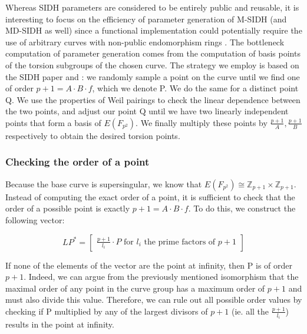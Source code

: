 \documentclass[a4paper,11pt,oneside]{report}
\begin{document}
    Whereas SIDH parameters are considered to be entirely public and reusable, it is interesting to focus on the efficiency of parameter generation of M-SIDH (and MD-SIDH as well) since a functional implementation could potentially require the use of arbitrary curves with non-public endomorphism rings \cite{msidh}. The bottleneck computation of parameter generation comes from the computation of basis points of the torsion subgroups of the chosen curve. The strategy we employ is based on the SIDH paper \cite{original-sidh} and \cite[Corollary 24.31]{pairing}: we randomly sample a point on the curve until we find one of order $p+1 = A\cdot B \cdot f$, which we denote P. We do the same for a distinct point Q. We use the properties of Weil pairings to check the linear dependence between the two points, and adjust our point Q until we have two linearly independent points that form a basis of $E(F_{ p^{2}})$. We finally multiply these points by $\frac{p+1}{A}, \frac{p+1}{B}$ respectively to obtain the desired torsion points.

        \subsubsection{Checking the order of a point}
    
        Because the base curve is supersingular, we know that $E(F_{ p^{2}}) \cong \mathbb{Z}_{p+1} \times \mathbb{Z}_{p+1}$. Instead of computing the exact order of a point, it is sufficient to check that the order of a possible point is exactly $p+1 = A \cdot B \cdot f$. To do this, we construct the following vector:
    
         \begin{displaymath}
         \label{eq:lp_star}
             LP^* = \begin{bmatrix}\frac{p+1}{l_i} \cdot P \textrm{  for } l_i \textrm{ the prime factors of } p+1\end{bmatrix} 
         \end{displaymath}
    
        If none of the elements of the vector are the point at infinity, then P is of order $p+1$. Indeed, we can argue from the previously mentioned isomorphism that the maximal order of any point in the curve group has a maximum order of $p+1$ and must also divide this value. Therefore, we can rule out all possible order values by checking if P multiplied by any of the largest divisors of $p+1$ (ie. all the $\frac{p+1}{l_i}$) results in the point at infinity. 
\end{document}
